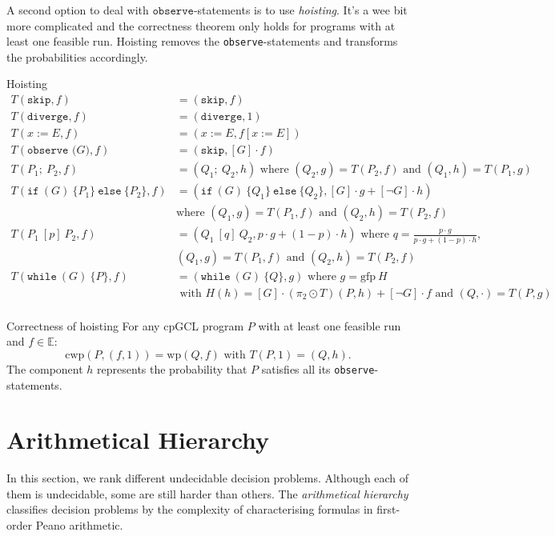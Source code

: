 \documentclass[english]{panikzettel}
\newcommand{\stmtSkip}{\texttt{skip}}
\newcommand{\stmtDiverge}{\texttt{diverge}}
\newcommand{\stmtAsgn}[2]{#1 := #2}
\newcommand{\stmtObserve}[1]{\texttt{observe (}#1\texttt{)}}
\newcommand{\stmtSeq}[2]{#1;~ #2}
\newcommand{\stmtIf}[3]{\texttt{if}~(#1)~\{ #2 \}~\texttt{else}~\{ #3 \}}
\newcommand{\stmtProb}[3]{#2 ~[#1]~ #3}
\newcommand{\stmtWhile}[2]{\texttt{while}~(#1)~\{ #2 \}}
\newcommand{\gfp}{\mathrm{gfp}~}
\renewcommand{\wp}{\mathrm{wp}}
\newcommand{\cwp}{\mathrm{cwp}}
\begin{document}
A second option to deal with $\texttt{observe}$-statements is to use \emph{hoisting}.
It's a wee bit more complicated and the correctness theorem only holds for programs with at least one feasible run.
Hoisting removes the \texttt{observe}-statements and transforms the probabilities accordingly.

\begin{defi}{Hoisting}
    \begin{align*}
        T(\stmtSkip,f) &= (\stmtSkip,f)\\
        T(\stmtDiverge,f) &= (\stmtDiverge,1)\\
        T(\stmtAsgn{x}{E},f) &= (\stmtAsgn{x}{E},f[\stmtAsgn{x}{E}]) \\
        T(\stmtObserve{G},f) &= (\stmtSkip,[G] \cdot f) \\
        T(\stmtSeq{P_1}{P_2},f) &= (\stmtSeq{Q_1}{Q_2},h) \text{ where } (Q_2,g)=T(P_2,f) \text{ and } (Q_1,h)=T(P_1,g) \\
        T(\stmtIf{G}{P_1}{P_2},f) &= (\stmtIf{G}{Q_1}{Q_2},[G] \cdot g + [\neg G] \cdot h) \\
        &  \text{where } (Q_1,g)=T(P_1,f) \text{ and } (Q_2,h)=T(P_2,f)\\
        T(\stmtProb{p}{P_1}{P_2},f) &= (\stmtProb{q}{Q_1}{Q_2},p \cdot g + (1-p) \cdot h) \text{ where } q=\frac{p \cdot g}{p \cdot g + (1-p) \cdot h},\\
        & (Q_1,g)=T(P_1,f) \text{ and } (Q_2,h)=T(P_2,f) \\
        T(\stmtWhile{G}{P},f) &= (\stmtWhile{G}{Q},g) \text{ where } g= \gfp H \\
        & \text{ with } H(h)=[G] \cdot (\pi_2 \odot T)(P,h) + [\neg G] \cdot f \text{ and } (Q, \cdot)=T(P,g)\\
    \end{align*}
\end{defi}

\begin{theo}{Correctness of hoisting}
    For any cpGCL program $P$ with at least one feasible run and $f \in \mathbb{E}$:
    $$\cwp(P,(f,1)) = \wp(Q,f) \text{  with  } T(P,1)=(Q,h).$$
    The component $h$ represents the probability that $P$ satisfies all its \texttt{observe}-statements.
\end{theo}

\section{Arithmetical Hierarchy}
In this section, we rank different undecidable decision problems.
Although each of them is undecidable, some are still harder than others.
The \emph{arithmetical hierarchy} classifies decision problems by the complexity of characterising formulas in first-order Peano arithmetic.
\end{document}
